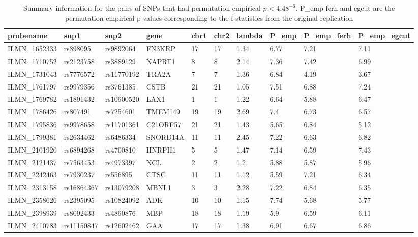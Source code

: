 \documentclass[paper=a4, fontsize=11pt]{scrartcl}         %
\numberwithin{equation}{section}                  %
\numberwithin{figure}{section}                    %
\numberwithin{table}{section}                   %
\begin{document}
\begin{landscape}
\begin{table}[ht]
\centering
\begin{tabular}{llllllllll}
  \hline
 probename & snp1 & snp2 & gene & chr1 & chr2 & lambda & P\_emp & P\_emp\_ferh & P\_emp\_egcut \\ 
  \hline
ILMN\_1652333 & rs898095 & rs9892064 & FN3KRP & 17 & 17 & 1.34 & 6.77 & 7.21 & 7.11 \\ 
ILMN\_1710752 & rs2123758 & rs3889129 & NAPRT1 & 8 & 8 & 2.14 & 7.36 & 7.42 & 6.99 \\ 
  ILMN\_1731043 & rs7776572 & rs11770192 & TRA2A & 7 & 7 & 1.36 & 6.84 & 4.19 & 3.67 \\ 
  ILMN\_1761797 & rs9979356 & rs3761385 & CSTB & 21 & 21 & 1.05 & 7.51 & 6.88 & 7.24 \\ 
  ILMN\_1769782 & rs1891432 & rs10900520 & LAX1 & 1 & 1 & 1.22 & 6.64 & 5.88 & 6.47 \\ 
  ILMN\_1786426 & rs807491 & rs7254601 & TMEM149 & 19 & 19 & 2.69 & 7.4 & 6.73 & 6.57 \\ 
  ILMN\_1795836 & rs9978658 & rs11701361 & C21ORF57 & 21 & 21 & 1.43 & 5.65 & 6.84 & 5.12 \\ 
  ILMN\_1799381 & rs2634462 & rs6486334 & SNORD14A & 11 & 11 & 2.45 & 7.22 & 6.63 & 6.82 \\ 
  ILMN\_2101920 & rs6894268 & rs4700810 & HNRPH1 & 5 & 5 & 1.47 & 7.14 & 6.59 & 7.43 \\ 
  ILMN\_2121437 & rs7563453 & rs4973397 & NCL & 2 & 2 & 1.2 & 5.88 & 5.87 & 5.96 \\ 
  ILMN\_2242463 & rs7930237 & rs556895 & CTSC & 11 & 11 & 1.12 & 5.59 & 7.21 & 6.34 \\ 
  ILMN\_2313158 & rs16864367 & rs13079208 & MBNL1 & 3 & 3 & 2.28 & 7.22 & 6.84 & 6.35 \\ 
  ILMN\_2358626 & rs2395095 & rs10824092 & ADK & 10 & 10 & 1.15 & 7.74 & 5.68 & 5.77 \\ 
  ILMN\_2398939 & rs8092433 & rs4890876 & MBP & 18 & 18 & 1.19 & 5.9 & 6.59 & 6.11 \\ 
  ILMN\_2410783 & rs11150847 & rs12602462 & GAA & 17 & 17 & 1.38 & 6.91 & 6.67 & 6.86 \\ 
   \hline
\end{tabular}
\caption*{Summary information for the pairs of SNPs that had permutation empirical $p<4.48^{-6}$. P\_emp ferh and egcut are the permutation empirical p-values corresponding to the f-statistics from the original replication}

\end{table}
\end{landscape}
\end{document}
